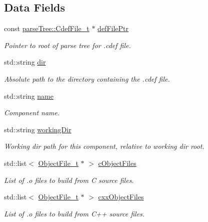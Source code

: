 \subsection*{Data Fields}
\begin{DoxyCompactItemize}
\item 
const \hyperlink{structparse_tree_1_1_cdef_file__t}{parse\+Tree\+::\+Cdef\+File\+\_\+t} $\ast$ \hyperlink{struct_component__t_a911ea1486e0793950d25f8a67ff28408}{def\+File\+Ptr}
\begin{DoxyCompactList}\small\item\em Pointer to root of parse tree for .cdef file. \end{DoxyCompactList}\item 
std\+::string \hyperlink{struct_component__t_ad9b96c9fe0ba63452b38722e57d01c2c}{dir}
\begin{DoxyCompactList}\small\item\em Absolute path to the directory containing the .cdef file. \end{DoxyCompactList}\item 
std\+::string \hyperlink{struct_component__t_ac82a73a6495bf5092a52be39bc529644}{name}
\begin{DoxyCompactList}\small\item\em Component name. \end{DoxyCompactList}\item 
std\+::string \hyperlink{struct_component__t_a016a5e5a867b3d35c33a30fd22c67f3c}{working\+Dir}
\begin{DoxyCompactList}\small\item\em Working dir path for this component, relative to working dir root. \end{DoxyCompactList}\item 
std\+::list$<$ \hyperlink{struct_object_file__t}{Object\+File\+\_\+t} $\ast$ $>$ \hyperlink{struct_component__t_add01ad639e5c905574c8c5b5ffc09c89}{c\+Object\+Files}
\begin{DoxyCompactList}\small\item\em List of .o files to build from C source files. \end{DoxyCompactList}\item 
std\+::list$<$ \hyperlink{struct_object_file__t}{Object\+File\+\_\+t} $\ast$ $>$ \hyperlink{struct_component__t_a7c448151842098af219545254b0ad36b}{cxx\+Object\+Files}
\begin{DoxyCompactList}\small\item\em List of .o files to build from C++ source files. \end{DoxyCompactList}\item 

\end{DoxyCompactItemize}
